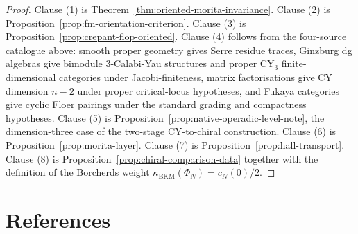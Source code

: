 \documentclass[11pt]{amsart}
\begin{document}
\begin{proof}
Clause (1) is Theorem~\ref{thm:oriented-morita-invariance}.  Clause (2)
is Proposition~\ref{prop:fm-orientation-criterion}.  Clause (3) is
Proposition~\ref{prop:crepant-flop-oriented}.  Clause (4) follows from
the four-source catalogue above: smooth proper geometry gives Serre
residue traces, Ginzburg dg algebras give bimodule 3-Calabi-Yau
structures and proper CY$_3$ finite-dimensional categories under
Jacobi-finiteness, matrix factorisations give CY dimension $n-2$ under
proper critical-locus hypotheses, and Fukaya categories give cyclic
Floer pairings under the standard grading and compactness hypotheses.
Clause (5) is Proposition~\ref{prop:native-operadic-level-note}, the
dimension-three case of the two-stage CY-to-chiral construction.
Clause (6) is Proposition~\ref{prop:morita-layer}.  Clause (7) is
Proposition~\ref{prop:hall-transport}.  Clause (8) is
Proposition~\ref{prop:chiral-comparison-data} together with the
definition of the Borcherds weight
$\kappa_{\mathrm{BKM}}(\Phi_N)=c_N(0)/2$.
\end{proof}

\section{References}
\end{document}
